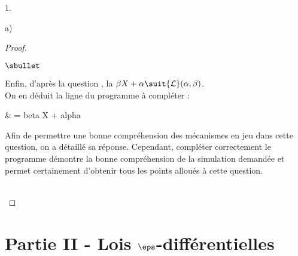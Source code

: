 \begin{noliste}{1.}
\begin{noliste}{a)}
\begin{proof}
\begin{noliste}{$\sbullet$}
      \item Enfin, d'après la question , la \var $\beta X +
        \alpha \suit {\cal L}(\alpha, \beta)$.\\
        On en déduit la ligne  du programme à compléter :
        \begin{scilabC}{7}
          & \qquad {} = beta \Sfois{} X + alpha 
        \end{scilabC}
      \end{noliste}
      \begin{remark}%
        Afin de permettre une bonne compréhension des mécanismes en
        jeu dans cette question, on a détaillé sa réponse. Cependant, 
	compléter correctement le programme
        \Scilab{} démontre la bonne compréhension de la simulation
        demandée et permet certainement d'obtenir tous les points
        alloués à cette question.%
      \end{remark}~\\[-1.4cm]
    \end{proof}
  \end{noliste}
\end{noliste}

\section*{Partie II - Lois $\eps$-différentielles}

